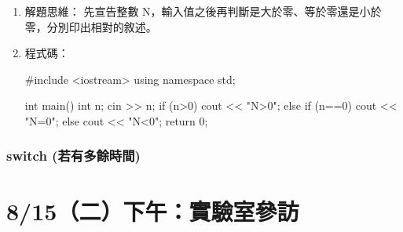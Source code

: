 \begin{enumerate}
\begin{enumerate}
			\item 解題思維：
			\subitem 先宣告整數 N，輸入值之後再判斷是大於零、等於零還是小於零，分別印出相對的敘述。
			
			\item 程式碼：
			\begin{cppcode}
				#include <iostream>
				using namespace std;
				
				int main()
				{
					int n;
					cin >> n;
					if (n>0) cout << "N>0";
					else if (n==0) cout << "N=0";
					else cout << "N<0";
					return 0;
				}
			\end{cppcode}
		\end{enumerate}
	
\end{enumerate}
\subsubsection{switch {\color{blue} (若有多餘時間)}}

\section{8/15（二）下午：實驗室參訪}


